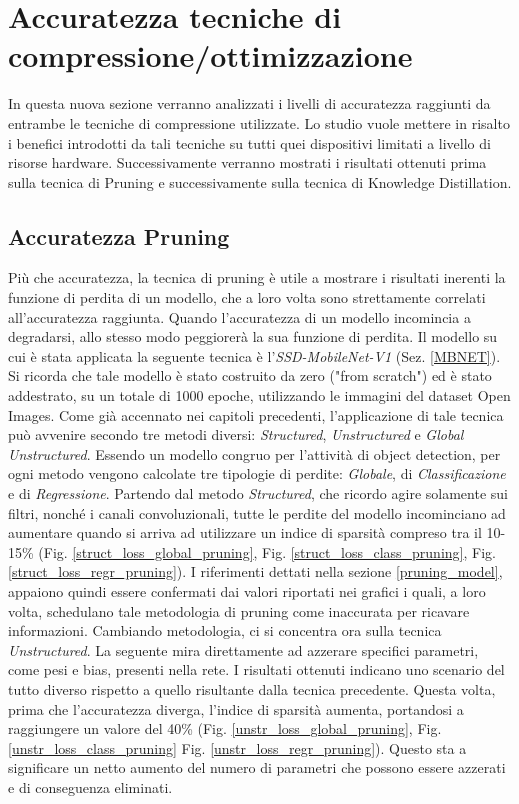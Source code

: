 \section{Accuratezza tecniche di compressione/ottimizzazione}
In questa nuova sezione verranno analizzati i livelli di accuratezza raggiunti da entrambe le tecniche di compressione utilizzate. Lo studio vuole mettere in risalto i benefici introdotti da tali tecniche su tutti quei dispositivi limitati a livello di risorse hardware.
Successivamente verranno mostrati i risultati ottenuti prima sulla tecnica di Pruning e successivamente sulla tecnica di Knowledge Distillation.

\subsection{Accuratezza Pruning}
Più che accuratezza, la tecnica di pruning è utile a mostrare i risultati inerenti la funzione di perdita di un modello, che a loro volta sono strettamente correlati all'accuratezza raggiunta. Quando l'accuratezza di un modello incomincia a degradarsi, allo stesso modo peggiorerà la sua funzione di perdita. Il modello su cui è stata applicata la seguente tecnica è l'\emph{SSD-MobileNet-V1} (Sez. \ref{MBNET}).
Si ricorda che tale modello è stato costruito da zero ("from scratch") ed è stato addestrato, su un totale di 1000 epoche, utilizzando le immagini del dataset Open Images.
Come già accennato nei capitoli precedenti, l'applicazione di tale tecnica può avvenire secondo tre metodi diversi: \emph{Structured}, \emph{Unstructured} e \emph{Global Unstructured}.
Essendo un modello congruo per l'attività di object detection, per ogni metodo vengono calcolate tre tipologie di perdite: \emph{Globale}, di \emph{Classificazione} e di \emph{Regressione}.
Partendo dal metodo \emph{Structured}, che ricordo agire solamente sui filtri, nonché i canali convoluzionali, tutte le perdite del modello incominciano ad aumentare quando si arriva ad utilizzare un indice di sparsità compreso tra il 10-15\% (Fig. \ref{struct_loss_global_pruning}, Fig. \ref{struct_loss_class_pruning}, Fig.\ref{struct_loss_regr_pruning}). I riferimenti dettati nella sezione \ref{pruning_model}, appaiono quindi essere confermati dai valori riportati nei grafici i quali, a loro volta, schedulano tale metodologia di pruning come inaccurata per ricavare informazioni. 
Cambiando metodologia, ci si concentra ora sulla tecnica \emph{Unstructured}. La seguente mira direttamente ad azzerare specifici parametri, come pesi e bias, presenti nella rete. I risultati ottenuti indicano uno scenario del tutto diverso rispetto a quello risultante dalla tecnica precedente. Questa volta, prima che l'accuratezza diverga, l'indice di sparsità aumenta, portandosi a raggiungere un valore del 40\% (Fig. \ref{unstr_loss_global_pruning}, Fig. \ref{unstr_loss_class_pruning} Fig. \ref{unstr_loss_regr_pruning}). Questo sta a significare un netto aumento del numero di parametri che possono essere azzerati e di conseguenza eliminati. 
